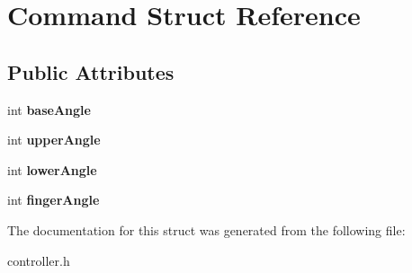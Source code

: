 \hypertarget{struct_command}{}\section{Command Struct Reference}
\label{struct_command}
\subsection*{Public Attributes}
\begin{DoxyCompactItemize}
\item 
\mbox{\label{struct_command_a443f10e416bca15f55402458b2e03c47}} 
int {\bfseries base\+Angle}
\item 
\mbox{\label{struct_command_ad96d921554a260d14e929d094eb1ac78}} 
int {\bfseries upper\+Angle}
\item 
\mbox{\label{struct_command_acd7a5e14835136f9552c11f7a384c2d4}} 
int {\bfseries lower\+Angle}
\item 
\mbox{\label{struct_command_a47af13c81ab5095a0dea24ceb7de362e}} 
int {\bfseries finger\+Angle}
\end{DoxyCompactItemize}


The documentation for this struct was generated from the following file\+:\begin{DoxyCompactItemize}
\item 
controller.\+h\end{DoxyCompactItemize}
